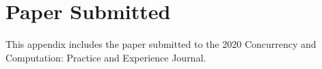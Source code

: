 \chapter{Paper Submitted} \label{ap:paper}

This appendix includes the paper submitted to the 2020 Concurrency and Computation: Practice and Experience Journal.

